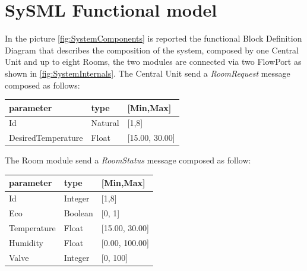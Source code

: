 \section{SySML Functional model}
In the picture \ref{fig:SystemComponents} is reported the functional Block Definition Diagram that describes the composition of the system, composed by one Central Unit and up to eight Rooms, the two modules are connected via two FlowPort as shown in \ref{fig:SystemInternals}.
The Central Unit send a \textit{RoomRequest} message composed as follows:
\begin{center}
	\begin{tabular}{||l | l| l ||} 
		\hline
		\textbf{parameter} 	& \textbf{type} & \textbf{[Min,Max]}\\ 
		\hline
		Id 					&  Natural & [1,8] \\ 
		\hline
		DesiredTemperature 	&  Float & [15.00, 30.00] \\ 
		\hline
	\end{tabular}
\end{center}
The Room module send a \textit{RoomStatus} message composed as follow:
\begin{center}
	\begin{tabular}{||l | l| l ||} 
		\hline
		\textbf{parameter} 	& \textbf{type} & \textbf{[Min,Max]}\\ 
		\hline
		Id 					&  Integer & [1,8] \\ 
		\hline
		Eco				 	&  Boolean & [0, 1] \\ 
		\hline
		Temperature			&  Float & [15.00, 30.00] \\ 
		\hline
		Humidity			&  Float & [0.00, 100.00] \\ 
		\hline
		Valve				&  Integer & [0, 100] \\ 
		\hline
	\end{tabular}
\end{center}


